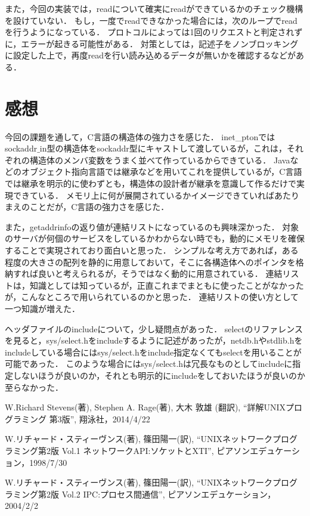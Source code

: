 \documentclass[a4paper,dvipdfmx]{jsarticle}
\begin{document}
また，今回の実装では，readについて確実にreadができているかのチェック機構を設けていない．
もし，一度でreadできなかった場合には，次のループでreadを行うようになっている．
プロトコルによっては1回のリクエストと判定されずに，エラーが起きる可能性がある．
対策としては，記述子をノンブロッキングに設定した上で，再度readを行い読み込めるデータが無いかを確認するなどがある．

\section{感想}
今回の課題を通して，C言語の構造体の強力さを感じた．
inet\_ptonではsockaddr$\_$in型の構造体をsockaddr型にキャストして渡しているが，これは，それぞれの構造体のメンバ変数をうまく並べて作っているからできている．
Javaなどのオブジェクト指向言語では継承などを用いてこれを提供しているが，C言語では継承を明示的に使わずとも，構造体の設計者が継承を意識して作るだけで実現できている．
メモリ上に何が展開されているかイメージできていればあたりまえのことだが，C言語の強力さを感じた．

また，getaddrinfoの返り値が連結リストになっているのも興味深かった．
対象のサーバが何個のサービスをしているかわからない時でも，動的にメモリを確保することで実現されており面白いと思った．
シンプルな考え方であれば，ある程度の大きさの配列を静的に用意しておいて，そこに各構造体へのポインタを格納すれば良いと考えられるが，そうではなく動的に用意されている．
連結リストは，知識としては知っているが，正直これまでまともに使ったことがなかったが，こんなところで用いられているのかと思った．
連結リストの使い方として一つ知識が増えた．

ヘッダファイルのincludeについて，少し疑問点があった．
selectのリファレンスを見ると，sys/select.hをincludeするように記述があったが，netdb.hやstdlib.hをincludeしている場合にはsys/select.hをinclude指定なくてもselectを用いることが可能であった．
このような場合にはsys/select.hは冗長なものとしてincludeに指定しないほうが良いのか，それとも明示的にincludeをしておいたほうが良いのか至らなかった．


\begin{thebibliography}{9}
  W.Richard Stevens(著), Stephen A. Rage(著),  大木 敦雄 (翻訳), ``詳解UNIXプログラミング 第3版'', 翔泳社，2014/4/22

  W.リチャード・スティーヴンス(著), 篠田陽一(訳), ``UNIXネットワークプログラミング第2版 Vol.1 ネットワークAPI:ソケットとXTI'', ピアソンエデュケーション，1998/7/30

 W.リチャード・スティーヴンス(著), 篠田陽一(訳), ``UNIXネットワークプログラミング第2版 Vol.2 IPC:プロセス間通信'', ピアソンエデュケーション，2004/2/2
 
\end{thebibliography}
\end{document}
